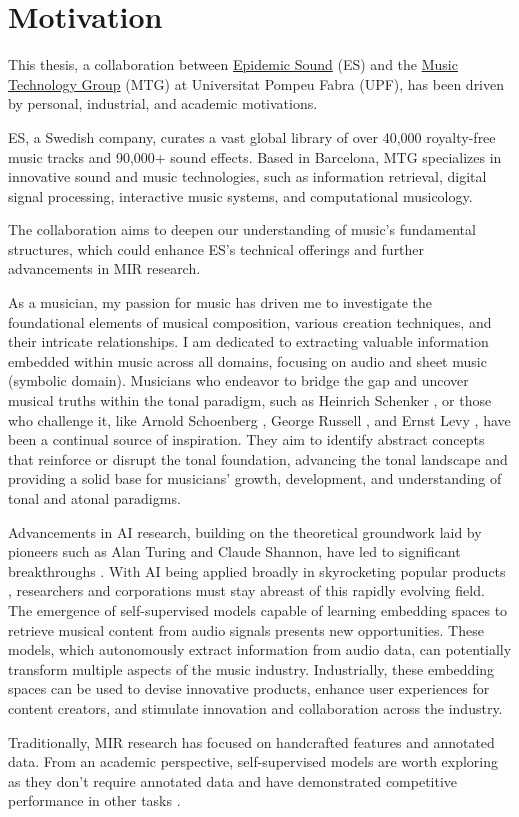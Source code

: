\section{Motivation}

This thesis, a collaboration between \href{https://www.epidemicsound.com/}{Epidemic Sound} (ES) and the \href{https://www.upf.edu/web/mtg}{Music Technology Group} (MTG) at Universitat Pompeu Fabra (UPF), has been driven by personal, industrial, and academic motivations. 

ES, a Swedish company, curates a vast global library of over 40,000 royalty-free music tracks and 90,000+ sound effects. Based in Barcelona, MTG specializes in innovative sound and music technologies, such as information retrieval, digital signal processing, interactive music systems, and computational musicology.

The collaboration aims to deepen our understanding of music's fundamental structures, which could enhance ES's technical offerings and further advancements in MIR research.

As a musician, my passion for music has driven me to investigate the foundational elements of musical composition, various creation techniques, and their intricate relationships. I am dedicated to extracting valuable information embedded within music across all domains, focusing on audio and sheet music (symbolic domain). Musicians who endeavor to bridge the gap and uncover musical truths within the tonal paradigm, such as Heinrich Schenker \cite{Komar1959SchenkersStructure}, or those who challenge it, like Arnold Schoenberg \cite{Samson1974SchoenbergsMusic}, George Russell \cite{LydianRussell}, and Ernst Levy \cite{LevyAHarmony}, have been a continual source of inspiration. They aim to identify abstract concepts that reinforce or disrupt the tonal foundation, advancing the tonal landscape and providing a solid base for musicians' growth, development, and understanding of tonal and atonal paradigms.

Advancements in AI research, building on the theoretical groundwork laid by pioneers such as Alan Turing and Claude Shannon, have led to significant breakthroughs \cite{Vaswani2017AttentionNeed}. With AI being applied broadly in skyrocketing popular products \cite{OpenAI2023GPT-4Report}, researchers and corporations must stay abreast of this rapidly evolving field. The emergence of self-supervised models capable of learning embedding spaces to retrieve musical content from audio signals presents new opportunities. These models, which autonomously extract information from audio data, can potentially transform multiple aspects of the music industry. Industrially, these embedding spaces can be used to devise innovative products, enhance user experiences for content creators, and stimulate innovation and collaboration across the industry.


Traditionally, MIR research has focused on handcrafted features and annotated data. From an academic perspective, self-supervised models are worth exploring as they don't require annotated data and have demonstrated competitive performance in other tasks \cite{Li2023MERT:Training}.

